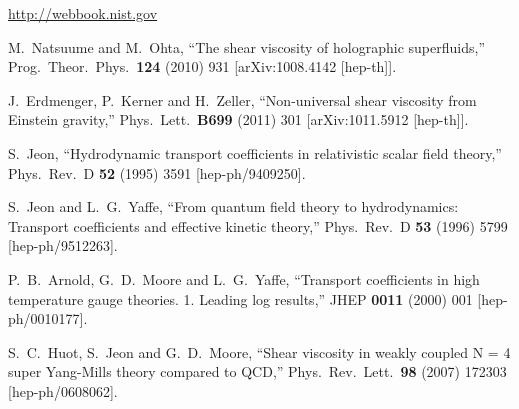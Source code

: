 \begin{thebibliography}{99}

%
%

\url{http://webbook.nist.gov}


  M.~Natsuume and M.~Ohta,
  ``The shear viscosity of holographic superfluids,''
  Prog.\ Theor.\ Phys.\  {\bf 124 } (2010)  931
  [arXiv:1008.4142 [hep-th]].

  J.~Erdmenger, P.~Kerner and H.~Zeller,
  ``Non-universal shear viscosity from Einstein gravity,''
  Phys.\ Lett.\  {\bf B699 } (2011)  301
  [arXiv:1011.5912 [hep-th]].
  

  S.~Jeon,
  ``Hydrodynamic transport coefficients in relativistic scalar field theory,''
  Phys.\ Rev.\ D {\bf 52} (1995) 3591
  [hep-ph/9409250].

  S.~Jeon and L.~G.~Yaffe,
  ``From quantum field theory to hydrodynamics: Transport coefficients and effective kinetic theory,''
  Phys.\ Rev.\ D {\bf 53} (1996) 5799
  [hep-ph/9512263].
  
  P.~B.~Arnold, G.~D.~Moore and L.~G.~Yaffe,
  ``Transport coefficients in high temperature gauge theories. 1. Leading log results,''
  JHEP {\bf 0011} (2000) 001
  [hep-ph/0010177].

  S.~C.~Huot, S.~Jeon and G.~D.~Moore,
  ``Shear viscosity in weakly coupled N = 4 super Yang-Mills theory compared to QCD,''
  Phys.\ Rev.\ Lett.\  {\bf 98} (2007) 172303
  [hep-ph/0608062].
  



\end{thebibliography}
